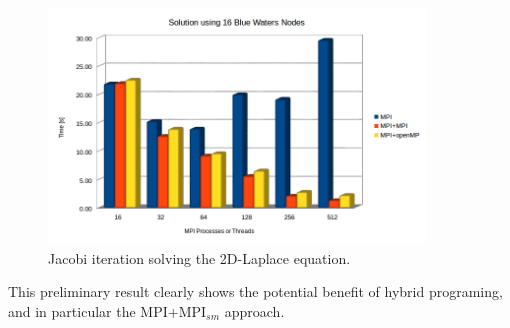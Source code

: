 \begin{figure}[h!]
    \centering
    \includegraphics[width=100mm]{Plots/section4/bw2-16.png}
    \caption{Jacobi iteration solving the 2D-Laplace equation.}
    \label{fig:Figure5}
\end{figure}

This preliminary result clearly shows the potential benefit of hybrid programing, and in particular the MPI+MPI$_{sm}$ approach.


